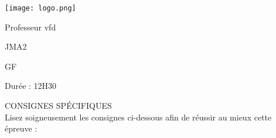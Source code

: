 \documentclass{book}%
\begin{document}
%
\normalsize%
\newpage%
\thispagestyle{empty}%
\vskip-40mm	\texttt{[image: logo.png]} \\%
 \begin{flushright}  \vskip-20mm   Professeur vfd\vskip15mm  \end{flushright}%
JMA2%
\begin{center}   \begin{Large}GF\end{Large} \end{center}%
Durée : 12H30%
 \begin{center} { \large CONSIGNES SPÉCIFIQUES } \\ Lisez soigneusement les consignes ci-dessous afin de réussir au mieux cette épreuve : \end{center} %
\end{document}
